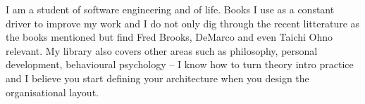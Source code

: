 


I am a student of software engineering and of life. Books I use as a constant driver to improve my work and I do not only dig through the recent litterature as the books mentioned but find Fred Brooks, DeMarco and even Taichi Ohno relevant. My library also covers other areas such as philosophy, personal development, behavioural psychology -- I know how to turn theory intro practice and I believe you start defining your architecture when you design the organisational layout.
